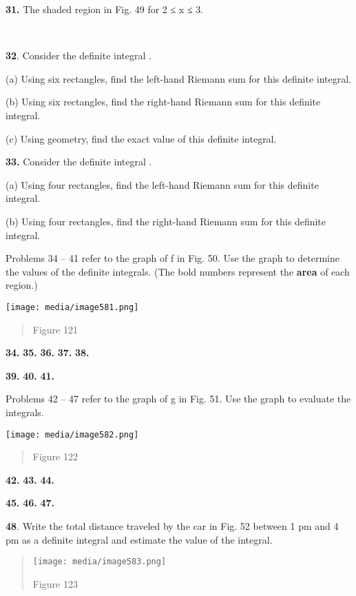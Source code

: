 \textbf{31.} The shaded region in Fig. 49 for 2 ≤ x ≤ 3.

\textbf{\\
}

\textbf{32}. Consider the definite integral .

(a) Using six rectangles, find the left-hand Riemann sum for this
definite integral.

(b) Using six rectangles, find the right-hand Riemann sum for this
definite integral.

(c) Using geometry, find the exact value of this definite integral.

\textbf{33.} Consider the definite integral .

(a) Using four rectangles, find the left-hand Riemann sum for this
definite integral.

(b) Using four rectangles, find the right-hand Riemann sum for this
definite integral.

Problems 34 -- 41 refer to the graph of f in Fig. 50. Use the graph to
determine the values of the definite integrals. (The bold numbers
represent the \textbf{area} of each region.)

\texttt{[image: media/image581.png]}

\begin{quote}
Figure 121
\end{quote}

\textbf{34.} \textbf{35.} \textbf{36.} \textbf{37.} \textbf{38.}

\textbf{39.} \textbf{40.} \textbf{41.}

Problems 42 -- 47 refer to the graph of g in Fig. 51. Use the graph to
evaluate the integrals.

\texttt{[image: media/image582.png]}

\begin{quote}
Figure 122
\end{quote}

\textbf{42.} \textbf{43.} \textbf{44.}

\textbf{45.} \textbf{46.} \textbf{47.}

\textbf{48}. Write the total distance traveled by the car in Fig. 52
between 1 pm and 4 pm as a definite integral and estimate the value of
the integral.

\begin{quote}
\texttt{[image: media/image583.png]}

Figure 123
\end{quote}


